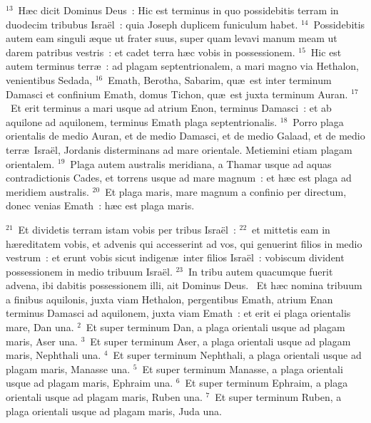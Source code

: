 ${}^{13}$~H\ae c dicit Dominus Deus~: Hic est terminus in quo possidebitis terram in duodecim tribubus Isra\"el~: quia Joseph duplicem funiculum habet.
${}^{14}$~Possidebitis autem eam singuli \ae que ut frater suus, super quam levavi manum meam ut darem patribus vestris~: et cadet terra h\ae c vobis in possessionem.
${}^{15}$~Hic est autem terminus terr\ae~: ad plagam septentrionalem, a mari magno via Hethalon, venientibus Sedada,
${}^{16}$~Emath, Berotha, Sabarim, qu\ae\ est inter terminum Damasci et confinium Emath, domus Tichon, qu\ae\ est juxta terminum Auran.
${}^{17}$~Et erit terminus a mari usque ad atrium Enon, terminus Damasci~: et ab aquilone ad aquilonem, terminus Emath plaga septentrionalis.
${}^{18}$~Porro plaga orientalis de medio Auran, et de medio Damasci, et de medio Galaad, et de medio terr\ae\ Isra\"el, Jordanis disterminans ad mare orientale. Metiemini etiam plagam orientalem.
${}^{19}$~Plaga autem australis meridiana, a Thamar usque ad aquas contradictionis Cades, et torrens usque ad mare magnum~: et h\ae c est plaga ad meridiem australis.
${}^{20}$~Et plaga maris, mare magnum a confinio per directum, donec venias Emath~: h\ae c est plaga maris.


${}^{21}$~Et dividetis terram istam vobis per tribus Isra\"el~:
${}^{22}$~et mittetis eam in h\ae reditatem vobis, et advenis qui accesserint ad vos, qui genuerint filios in medio vestrum~: et erunt vobis sicut indigen\ae\ inter filios Isra\"el~: vobiscum divident possessionem in medio tribuum Isra\"el.
${}^{23}$~In tribu autem quacumque fuerit advena, ibi dabitis possessionem illi, ait Dominus Deus.
~Et h\ae c nomina tribuum a finibus aquilonis, juxta viam Hethalon, pergentibus Emath, atrium Enan terminus Damasci ad aquilonem, juxta viam Emath~: et erit ei plaga orientalis mare, Dan una.
${}^{2}$~Et super terminum Dan, a plaga orientali usque ad plagam maris, Aser una.
${}^{3}$~Et super terminum Aser, a plaga orientali usque ad plagam maris, Nephthali una.
${}^{4}$~Et super terminum Nephthali, a plaga orientali usque ad plagam maris, Manasse una.
${}^{5}$~Et super terminum Manasse, a plaga orientali usque ad plagam maris, Ephraim una.
${}^{6}$~Et super terminum Ephraim, a plaga orientali usque ad plagam maris, Ruben una.
${}^{7}$~Et super terminum Ruben, a plaga orientali usque ad plagam maris, Juda una.


